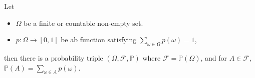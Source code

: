 \begin{theorem}
Let
\begin{itemize}
    \item $\Omega$ be a finite or countable non-empty set.
    \item $p: \Omega \to [0,1]$ be ab function satisfying $\sum\limits_{\omega \in \Omega} p(\omega) = 1$,
\end{itemize}
then there is a probability triple $(\Omega, \mathcal{F}, \mathbb{P})$ where $\mathcal{F} = \mathbb{P}(\Omega)$, and for $A \in \mathcal{F}$, $\mathbb{P}(A) = \sum\limits_{\omega \in A}p(\omega)$.
\end{theorem}